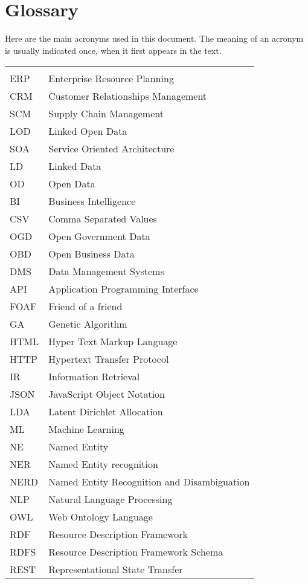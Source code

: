 \chapter*{Glossary}

Here are the main acronyms used in this document. The meaning of an acronym is usually indicated once, when it first appears in the text.

\begin{longtable}{lp{9cm}}
 &\\
 ERP &  Enterprise Resource Planning\\
 CRM & Customer Relationships Management\\
 SCM & Supply Chain Management\\
 LOD & Linked Open Data \\
 SOA & Service Oriented Architecture\\
 LD & Linked Data\\
 OD & Open Data\\
 BI & Business Intelligence\\
 CSV & Comma Separated Values\\
 OGD & Open Government Data\\
 OBD & Open Business Data\\
 DMS & Data Management Systems\\
 API  &   Application Programming Interface \\
 FOAF & Friend of a friend \\
 GA & Genetic Algorithm \\
 HTML &   Hyper Text Markup Language\\
 HTTP & Hypertext Transfer Protocol \\
 IR & Information Retrieval \\
 JSON & JavaScript Object Notation \\
 LDA & Latent Dirichlet Allocation \\
 ML & Machine Learning \\
 NE & Named Entity \\
 NER & Named Entity recognition\\
 NERD & Named Entity Recognition and Disambiguation \\
 NLP & Natural Language Processing \\
 OWL &  Web Ontology Language \\
 RDF  & Resource Description Framework\\
 RDFS & Resource Description Framework Schema \\
 REST & Representational State Transfer\\

\end{longtable}
